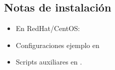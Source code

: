 \subsection{Notas de instalación}
\begin{itemize}
	\item En RedHat/CentOS: 
	\item Configuraciones ejemplo en 
	\item Scripts auxiliares en .
\end{itemize}



% 
